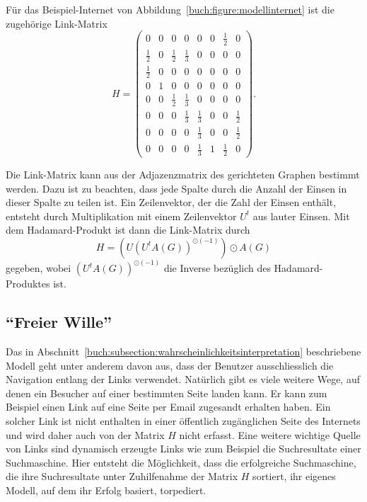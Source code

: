 \begin{beispiel}
Für das Beispiel-Internet von Abbildung~\ref{buch:figure:modellinternet}
ist die zugehörige Link-Matrix
\begin{equation}
H =
\begin{pmatrix}
   0   & 0&   0   &   0   &   0   & 0&\frac12&   0   \\
\frac12& 0&\frac12&\frac13&   0   & 0&   0   &   0   \\
\frac12& 0&   0   &   0   &   0   & 0&   0   &   0   \\
   0   & 1&   0   &   0   &   0   & 0&   0   &   0   \\
   0   & 0&\frac12&\frac13&   0   & 0&   0   &   0   \\
   0   & 0&   0   &\frac13&\frac13& 0&   0   &\frac12\\
   0   & 0&   0   &   0   &\frac13& 0&   0   &\frac12\\
   0   & 0&   0   &   0   &\frac13& 1&\frac12&   0
\end{pmatrix}.
\label{buch:google:eqn:linkmatrixbeispiel}
\end{equation}
\qedhere
\end{beispiel}
Die Link-Matrix kann aus der Adjazenzmatrix des gerichteten Graphen
bestimmt werden.
Dazu ist zu beachten, dass jede Spalte durch die Anzahl der Einsen 
in dieser Spalte zu teilen ist.
Ein Zeilenvektor, der die Zahl der Einsen enthält, entsteht durch
Multiplikation mit einem Zeilenvektor $U^t$ aus lauter Einsen.
Mit dem Hadamard-Produkt ist dann die Link-Matrix durch
\[
H
=
(U(U^tA(G))^{\odot(-1)})\odot A(G)
\]
gegeben, wobei $(U^tA(G))^{\odot(-1)}$ die Inverse bezüglich des
Hadamard-Produktes ist.
%
%
\subsection{``Freier Wille''
\label{buch:subsection:freier-wille}}
Das in
Abschnitt~\eqref{buch:subsection:wahrscheinlichkeitsinterpretation}
beschriebene Modell geht unter anderem davon aus, dass der Benutzer
ausschliesslich die Navigation entlang der Links verwendet.
Natürlich gibt es viele weitere Wege, auf denen ein Besucher auf einer
bestimmten Seite landen kann.
Er kann zum Beispiel einen Link auf eine Seite per Email zugesandt
erhalten haben.
Ein solcher Link ist nicht enthalten in einer öffentlich zugänglichen
Seite des Internets und wird daher auch von der Matrix $H$ nicht
erfasst.
Eine weitere wichtige Quelle von Links sind dynamisch erzeugte Links
wie zum Beispiel die Suchresultate einer Suchmaschine.
Hier entsteht die Möglichkeit, dass die erfolgreiche Suchmaschine,
die ihre Suchresultate unter Zuhilfenahme der Matrix $H$ sortiert,
ihr eigenes Modell, auf dem ihr Erfolg basiert, torpediert.

